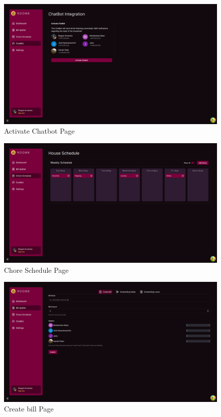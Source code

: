 \documentclass[12pt, titlepage]{article}
\begin{document}
\begin{figure}[H]
  \centering
  \includegraphics[width=\textwidth]{chatbot.png}
  \caption{Activate Chatbot Page}
  \label{fig:landing}
\end{figure}
\begin{figure}[H]
  \centering
  \includegraphics[width=\textwidth]{choreSchedule.png}
  \caption{Chore Schedule Page}
  \label{fig:landing}
\end{figure}
\begin{figure}[H]
  \centering
  \includegraphics[width=\textwidth]{createBill.png}
  \caption{Create bill Page}
  \label{fig:landing}
\end{figure}
\end{document}
